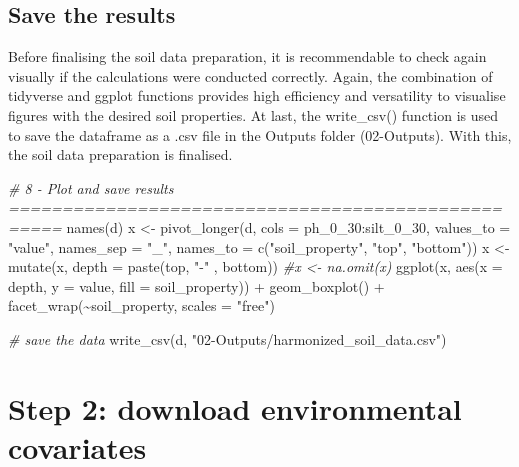\documentclass[
  10pt,
  b5paper,
  oneside]{book}
\newenvironment{Shaded}{\begin{snugshade}}{\end{snugshade}}
\newcommand{\AttributeTok}[1]{\textcolor[rgb]{0.77,0.63,0.00}{#1}}
\newcommand{\CommentTok}[1]{\textcolor[rgb]{0.56,0.35,0.01}{\textit{#1}}}
\newcommand{\FunctionTok}[1]{\textcolor[rgb]{0.00,0.00,0.00}{#1}}
\newcommand{\NormalTok}[1]{#1}
\newcommand{\OtherTok}[1]{\textcolor[rgb]{0.56,0.35,0.01}{#1}}
\newcommand{\SpecialCharTok}[1]{\textcolor[rgb]{0.00,0.00,0.00}{#1}}
\newcommand{\StringTok}[1]{\textcolor[rgb]{0.31,0.60,0.02}{#1}}
\begin{document}
\hypertarget{save-the-results}{%
\section{Save the results}\label{save-the-results}}

Before finalising the soil data preparation, it is recommendable to check again visually if the calculations were conducted correctly. Again, the combination of tidyverse and ggplot functions provides high efficiency and versatility to visualise figures with the desired soil properties. At last, the write\_csv() function is used to save the dataframe as a .csv file in the Outputs folder (02-Outputs). With this, the soil data preparation is finalised.

\begin{Shaded}
\begin{Highlighting}[]
\CommentTok{\# 8 {-} Plot  and save results ===================================================}
\FunctionTok{names}\NormalTok{(d)}
\NormalTok{x }\OtherTok{\textless{}{-}} \FunctionTok{pivot\_longer}\NormalTok{(d, }\AttributeTok{cols =}\NormalTok{ ph\_0\_30}\SpecialCharTok{:}\NormalTok{silt\_0\_30, }\AttributeTok{values\_to =} \StringTok{"value"}\NormalTok{,}
                  \AttributeTok{names\_sep =} \StringTok{"\_"}\NormalTok{, }
                  \AttributeTok{names\_to =} \FunctionTok{c}\NormalTok{(}\StringTok{"soil\_property"}\NormalTok{, }\StringTok{"top"}\NormalTok{, }\StringTok{"bottom"}\NormalTok{))}
\NormalTok{x }\OtherTok{\textless{}{-}} \FunctionTok{mutate}\NormalTok{(x, }\AttributeTok{depth =} \FunctionTok{paste}\NormalTok{(top, }\StringTok{"{-}"}\NormalTok{ , bottom))}
\CommentTok{\#x \textless{}{-} na.omit(x)}
\FunctionTok{ggplot}\NormalTok{(x, }\FunctionTok{aes}\NormalTok{(}\AttributeTok{x =}\NormalTok{ depth, }\AttributeTok{y =}\NormalTok{ value, }\AttributeTok{fill =}\NormalTok{ soil\_property)) }\SpecialCharTok{+}
  \FunctionTok{geom\_boxplot}\NormalTok{() }\SpecialCharTok{+} 
  \FunctionTok{facet\_wrap}\NormalTok{(}\SpecialCharTok{\textasciitilde{}}\NormalTok{soil\_property, }\AttributeTok{scales =} \StringTok{"free"}\NormalTok{)}

\CommentTok{\# save the data}
\FunctionTok{write\_csv}\NormalTok{(d, }\StringTok{"02{-}Outputs/harmonized\_soil\_data.csv"}\NormalTok{)}
\end{Highlighting}
\end{Shaded}

\hypertarget{step-2-download-environmental-covariates}{%
\chapter{Step 2: download environmental covariates}\label{step-2-download-environmental-covariates}}
\end{document}
